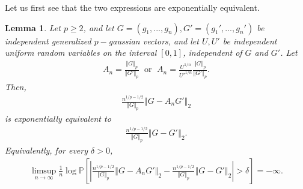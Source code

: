 \documentclass[10pt]{amsart}
\newtheorem{lemma}{Lemma}[section]
\newcounter{theor}
\numberwithin{equation}{section}
\begin{document}
Let us first see that the two expressions are exponentially equivalent.
\begin{lemma}
\label{LemExpEquivalentpgeq2Boundary}
Let $p\geq 2$, and let $G=(g_1,...,g_n), G'=(g_1',...,g_n')$ be independent generalized $p-$gaussian vectors, and let $U,U'$ be independent uniform random variables on the interval $[0,1]$, independent of $G$ and $G'$. Let
\begin{align*}
A_n = \frac{\Vert G \Vert _p}{\Vert G' \Vert _p} \; \text{ or } \; A_n = \frac{U^{1/n}}{U'^{1/n}} \frac{\Vert G \Vert _p}{\Vert G' \Vert _p}.
\end{align*} 
Then,
\begin{align*}
\frac{n^{1/p - 1/2}}{\Vert G \Vert _p} \left\Vert  G - A_n G' \right\Vert_2
\end{align*}
is exponentially equivalent to
\begin{align*}
\frac{n^{1/p - 1/2}}{\Vert G \Vert _p} \left\Vert  G - G' \right\Vert_2.
\end{align*}
Equivalently, for every $\delta >0$, 
\begin{align*}
\limsup _{n \to \infty}  \frac{1}{n} \log \mathbb{P} \left[ \left|  \frac{n^{1/p - 1/2}}{\Vert G \Vert _p} \left\Vert  G - A_n G' \right\Vert_2 - 
\frac{n^{1/p - 1/2}}{\Vert G \Vert _p} \left\Vert  G - G' \right\Vert_2
 \right|  > \delta \right] = -\infty .
\end{align*}
\end{lemma}
\end{document}
